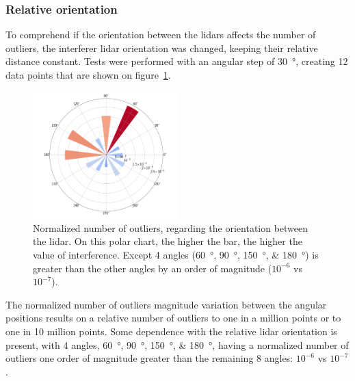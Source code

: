 \subsubsection{Relative orientation}
To comprehend if the orientation between the \acp{lidar} affects the number of outliers, the interferer \ac{lidar} orientation was changed, keeping their relative distance constant. Tests were performed with an angular step of \SI{30}{\degree}, creating 12 data points that are shown on figure~\ref{fig:box-filter-outliers-direction}.

\begin{figure}[!ht]
	\centering
	\includegraphics[width=0.5\textwidth]{img/lidar-interference/box-filtering/interference-box-filter-outliers-direction.png}
	\caption{Normalized number of outliers, regarding the orientation between the \ac{lidar}. On this polar chart, the higher the bar, the higher the value of interference. Except 4 angles (\SIlist[list-final-separator = {, }]{60; 90; 150; 180}{\degree}) is greater than the other angles by an order of magnitude ($10^{-6}$ vs $10^{-7}$).}
	\label{fig:box-filter-outliers-direction}
\end{figure}

The normalized number of outliers magnitude variation between the angular positions results on a relative number of outliers to one in a million points or to one in 10 million points. Some dependence with the relative \ac{lidar} orientation is present, with 4 angles, \SIlist[list-final-separator = {, }]{60; 90; 150; 180}{\degree}, having a normalized number of outliers one order of magnitude greater than the remaining 8 angles: $10^{-6}$ vs $10^{-7}$.



